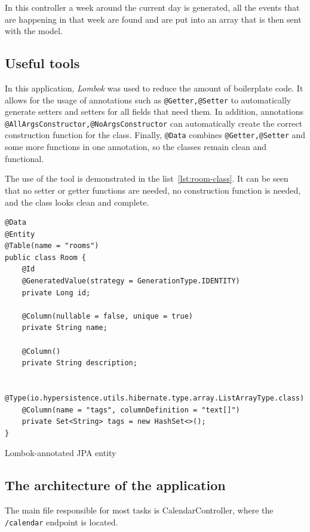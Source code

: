 In this controller a week around the current day is generated, all the events that are happening in that week are found and are put into an array that is then sent with the model.


\subsection{Useful tools}\label{subsec:useful-tools}
In this application, \textit{Lombok} was used to reduce the amount of boilerplate code.
It allows for the usage of annotations such as \texttt{@Getter,@Setter} to automatically generate setters and setters for all fields that need them.
In addition, annotations \texttt{@AllArgsConstructor,@NoArgsConstructor} can automatically create the correct construction function for the class.
Finally, \texttt{@Data} combines \texttt{@Getter,@Setter} and some more functions in one annotation, so the classes remain clean and functional.

The use of the tool is demonstrated in the list~\ref{lst:room-class}.
It can be seen that no setter or getter functions are needed, no construction function is needed, and the class looks clean and complete.


\begin{listing}[H]
\begin{verbatim}
@Data
@Entity
@Table(name = "rooms")
public class Room {
    @Id
    @GeneratedValue(strategy = GenerationType.IDENTITY)
    private Long id;

    @Column(nullable = false, unique = true)
    private String name;

    @Column()
    private String description;

    @Type(io.hypersistence.utils.hibernate.type.array.ListArrayType.class)
    @Column(name = "tags", columnDefinition = "text[]")
    private Set<String> tags = new HashSet<>();
}
\end{verbatim}
\caption{Lombok-annotated JPA entity}
\label{lst:room-class}
\end{listing}


\newpage%

\subsection{The architecture of the application}\label{subsec:the-architecture-of-the-application}

The main file responsible for most tasks is CalendarController, where the \texttt{/calendar} endpoint is located.

